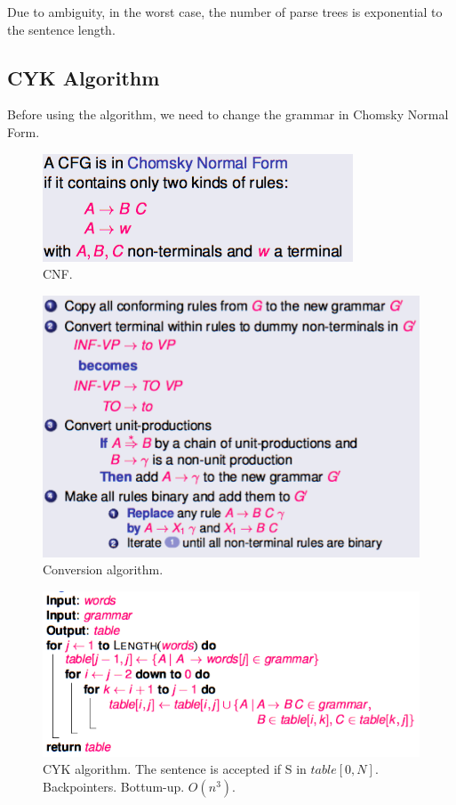 Due to ambiguity, in the worst case, the number of parse trees is exponential to the sentence length.

\subsection{CYK Algorithm}

Before using the algorithm, we need to change the grammar in Chomsky Normal Form.

\begin{figure}[htp]
	\centering
	\includegraphics[scale=0.5]{images/45_chomsky.png}
 	\caption{CNF.}
\end{figure}

\begin{figure}[htp]
	\centering
	\includegraphics[scale=0.5]{images/46_conversion.png}
 	\caption{Conversion algorithm.}
\end{figure}

\begin{figure}[H]
	\centering
	\includegraphics[scale=0.6]{images/47_cyk.png}
 	\caption{CYK algorithm. The sentence is accepted if S in $table[0,N]$. Backpointers. Bottum-up. $O(n^3)$.}
\end{figure}


